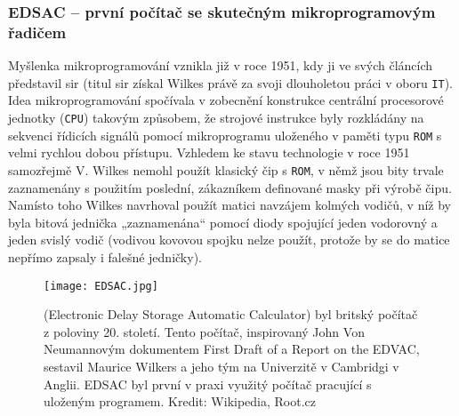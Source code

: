 {      \subsubsection{EDSAC – první počítač se skutečným mikroprogramovým řadičem}
        Myšlenka mikroprogramování vznikla již v roce 1951, kdy ji ve svých článcích představil sir 
        \wikiEWilkes (titul sir získal Wilkes právě za svoji dlouholetou práci v oboru 
        \texttt{IT}). Idea mikroprogramování spočívala v zobecnění konstrukce centrální procesorové 
        jednotky (\texttt{CPU}) takovým způsobem, že strojové instrukce byly rozkládány na sekvenci 
        řídicích signálů pomocí mikroprogramu uloženého v paměti typu \texttt{ROM} s velmi rychlou 
        dobou přístupu. Vzhledem ke stavu technologie v roce 1951 samozřejmě V. Wilkes nemohl 
        použít klasický čip s \texttt{ROM}, v němž jsou bity trvale zaznamenány s použitím 
        poslední, zákazníkem definované masky při výrobě čipu. Namísto toho Wilkes navrhoval použít 
        matici navzájem kolmých vodičů, v níž by byla bitová jednička „zaznamenána“ pomocí diody 
        spojující jeden vodorovný a jeden svislý vodič (vodivou kovovou spojku nelze použít, 
        protože by se do matice nepřímo zapsaly i falešné jedničky).
        
        \begin{figure}[ht!]   %
          \centering
          \texttt{[image: EDSAC.jpg]}
          \caption{\wikiEDSAC (Electronic Delay Storage Automatic Calculator) byl britský počítač z 
                   poloviny 20. století. Tento počítač, inspirovaný John Von Neumannovým dokumentem 
                   First Draft of a Report on the EDVAC, sestavil Maurice Wilkers a jeho tým na 
                   Univerzitě v Cambridgi v Anglii. EDSAC byl první v praxi využitý počítač 
                   pracující s uloženým programem. Kredit: Wikipedia, Root.cz}
          \label{MIT:fig_edsac}
        \end{figure}
        
}
